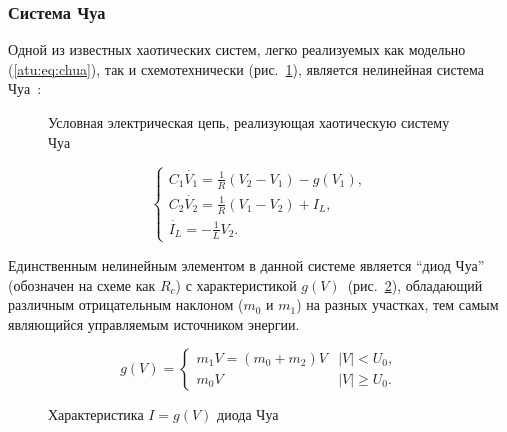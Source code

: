
\FloatBarrier
\subsubsection{Система Чуа} %


Одной из известных хаотических систем, легко реализуемых как модельно (\ref{atu:eq:chua}),
так и схемотехнически (рис.~\ref{atu:f:chuascheme}),
является нелинейная система Чуа~\cite{moon_chaotic_vibr,buga_chua}:

\begin{figure}[htb!]
\begin{center}

\end{center}
\caption{Условная электрическая цепь, реализующая хаотическую систему Чуа}
\label{atu:f:chuascheme}
\end{figure}


\begin{equation}
\begin{cases}
  C_1 \dot{V_1}  = \frac{1}{R} ( V_2 - V_1 ) - g(V_1), \\
  C_2 \dot{V_2}  = \frac{1}{R} ( V_1 - V_2 ) + I_L, \\
  \dot{I_L}      = - \frac{1}{L} V_2 .
\end{cases}
\label{atu:eq:chua}
\end{equation}

Единственным нелинейным элементом в данной системе является ``диод Чуа''
(обозначен на схеме как $R_c$) с
характеристикой $g(V)$~(рис.~\ref{atu:f:diodchua}),
обладающий различным отрицательным наклоном
($m_0$ и $m_1$) на разных участках,
тем самым являющийся управляемым источником энергии.


\begin{equation}
g(V) =
\begin{cases}
  m_1 V = ( m_0 + m_2 ) V & |V| <   U_0, \\
  m_0 V                   & |V| \ge U_0.
\end{cases}
\label{atu:eq:diodchua}
\end{equation}

\begin{figure}[htb!]
\begin{center}

\end{center}
\caption{Характеристика \(I=g(V)\) диода Чуа}
\label{atu:f:diodchua}
\end{figure}



